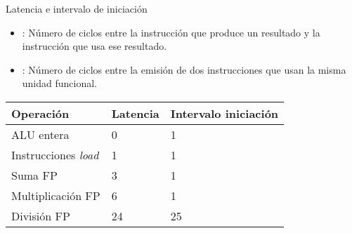 \begin{frame}[t]{Latencia e intervalo de iniciación}
\begin{itemize}
  \item {}: Número de ciclos entre la instrucción que produce un resultado y la instrucción que usa ese resultado.
  \item {}: Número de ciclos entre la emisión de dos instrucciones que usan la misma unidad funcional. 
\end{itemize}

{
\begin{tabular}[c]{*{3}{|p{.3\textwidth}}|}
\hline
Operación & Latencia & Intervalo iniciación 
\\
\hline
\hline

ALU entera  &
0  &
1
\\
\hline

Instrucciones \emph{load}&
1 &
1
\\
\hline

Suma FP &
3 &
1
\\
\hline

Multiplicación FP &
6 &
1
\\
\hline

División FP &
24 &
25
\\
\hline

\end{tabular}
}

\end{frame} 
